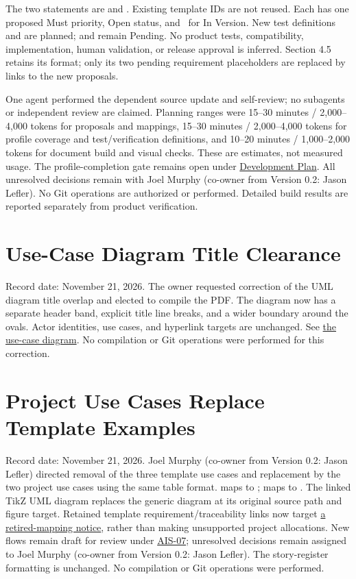The two statements are  and
. Existing template IDs are not reused. Each has
one proposed Must priority, Open status, and \NoVersion\ for In Version.
New test definitions  and  are planned;
 and  remain Pending.
No product tests, compatibility, implementation, human validation, or release
approval is inferred. Section 4.5 retains its format; only its two pending
requirement placeholders are replaced by links to the new proposals.

One agent performed the dependent source update and self-review; no subagents
or independent review are claimed. Planning ranges were 15--30 minutes /
2,000--4,000 tokens for proposals and mappings, 15--30 minutes /
2,000--4,000 tokens for profile coverage and test/verification definitions,
and 10--20 minutes / 1,000--2,000 tokens for document build and visual checks.
These are estimates, not measured usage. The profile-completion gate remains
open under \hyperref[Section:RequirementsCompletionGate]{Development Plan}.
All unresolved decisions remain with Joel Murphy (co-owner from Version 0.2: Jason Lefler). No Git operations are
authorized or performed. Detailed build results are reported separately
from product verification.

\section{Use-Case Diagram Title Clearance}
Record date: November 21, 2026. The owner requested correction of the UML
diagram title overlap and elected to compile the PDF. The diagram now has
a separate header band, explicit title line breaks, and a wider boundary
around the ovals. Actor identities, use cases, and hyperlink targets are
unchanged. See \hyperref[Figure:UseCaseDiagram]{the use-case diagram}.
No compilation or Git operations were performed for this correction.

\section{Project Use Cases Replace Template Examples}
Record date: November 21, 2026. Joel Murphy (co-owner from Version 0.2: Jason Lefler) directed removal of the three
template use cases and replacement by the two project use cases using the
same table format.  maps to ;
 maps to . The linked TikZ UML diagram
replaces the generic diagram at its original source path and figure target.
Retained template requirement/traceability links now target
\hyperref[Section:RetiredTemplateUseCases]{a retired-mapping notice}, rather
than making unsupported project allocations. New flows remain draft for
review under \hyperref[Skill:AIS-07]{AIS-07}; unresolved decisions remain
assigned to Joel Murphy (co-owner from Version 0.2: Jason Lefler). The story-register formatting is unchanged.
No compilation or Git operations were performed.

